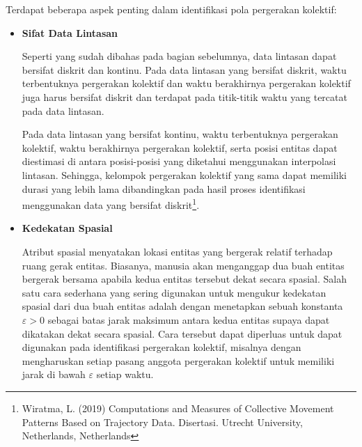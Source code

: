 \documentclass[a4paper,twoside]{article}
\begin{document}
Terdapat beberapa aspek penting dalam identifikasi pola pergerakan kolektif:

\begin{itemize}[noitemsep, nolistsep]
    \item \textbf{Sifat Data Lintasan}
    
    Seperti yang sudah dibahas pada bagian sebelumnya, data lintasan dapat bersifat diskrit dan kontinu. Pada data lintasan yang bersifat diskrit, waktu terbentuknya pergerakan kolektif dan waktu berakhirnya pergerakan kolektif juga harus bersifat diskrit dan terdapat pada titik-titik waktu yang tercatat pada data lintasan.
    
    Pada data lintasan yang bersifat kontinu, waktu terbentuknya pergerakan kolektif, waktu berakhirnya pergerakan kolektif, serta posisi entitas dapat diestimasi di antara posisi-posisi yang diketahui menggunakan interpolasi lintasan. Sehingga, kelompok pergerakan kolektif yang sama dapat memiliki durasi yang lebih lama dibandingkan pada hasil proses identifikasi menggunakan data yang bersifat diskrit\footnote{Wiratma, L. (2019) Computations and Measures of Collective Movement Patterns Based on Trajectory Data. Disertasi. Utrecht University, Netherlands, Netherlands}.
    \item \textbf{Kedekatan Spasial}
    
    Atribut spasial menyatakan lokasi entitas yang bergerak relatif terhadap ruang gerak entitas. Biasanya, manusia akan menganggap dua buah entitas bergerak bersama apabila kedua entitas tersebut dekat secara spasial. Salah satu cara sederhana yang sering digunakan untuk mengukur kedekatan spasial dari dua buah entitas adalah dengan menetapkan sebuah konstanta $\varepsilon > 0$ \iffalse \lionov{pake varepsilon ($\varepsilon$)} \fi sebagai batas jarak maksimum antara kedua entitas supaya dapat dikatakan dekat secara spasial. Cara tersebut dapat diperluas untuk dapat digunakan pada identifikasi pergerakan kolektif, misalnya dengan mengharuskan setiap pasang anggota pergerakan kolektif untuk memiliki jarak di bawah $\varepsilon$ setiap waktu.
    

\end{itemize}
\end{document}
